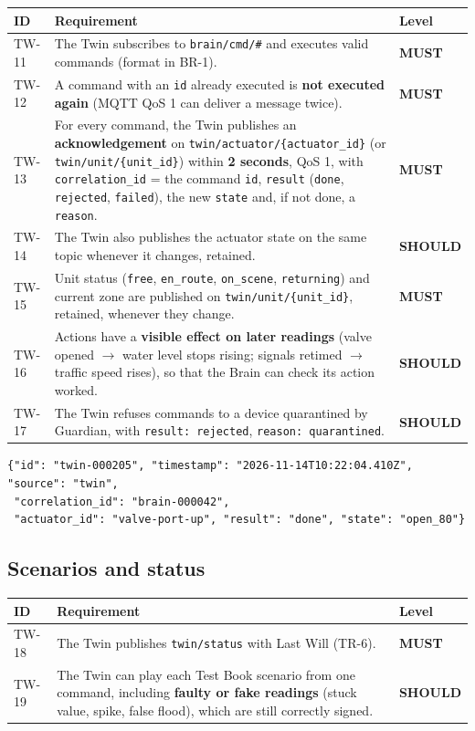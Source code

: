 \documentclass[11pt,a4paper]{article}
\newcommand{\code}[1]{\texttt{#1}}
\newcommand{\MUST}{\textbf{\textcolor{must}{MUST}}}
\newcommand{\SHOULD}{\textbf{\textcolor{should}{SHOULD}}}
\begin{document}
\begin{longtable}{@{}l p{10.9cm} l@{}}
\toprule
\textbf{ID} & \textbf{Requirement} & \textbf{Level} \\
\midrule
\endhead
TW-11 & The Twin subscribes to \code{brain/cmd/\#} and executes valid commands (format in BR-1). & \MUST \\
TW-12 & A command with an \code{id} already executed is \textbf{not executed again} (MQTT QoS 1 can deliver a message twice). & \MUST \\
TW-13 & For every command, the Twin publishes an \textbf{acknowledgement} on \code{twin/\allowbreak actuator/\allowbreak \{actuator\_id\}} (or \code{twin/\allowbreak unit/\allowbreak \{unit\_id\}}) within \textbf{2 seconds}, QoS 1, with \code{correlation\_id} = the command \code{id}, \code{result} (\code{done}, \code{rejected}, \code{failed}), the new \code{state} and, if not done, a \code{reason}. & \MUST \\
TW-14 & The Twin also publishes the actuator state on the same topic whenever it changes, retained. & \SHOULD \\
TW-15 & Unit status (\code{free}, \code{en\_route}, \code{on\_scene}, \code{returning}) and current zone are published on \code{twin/\allowbreak unit/\allowbreak \{unit\_id\}}, retained, whenever they change. & \MUST \\
TW-16 & Actions have a \textbf{visible effect on later readings} (valve opened $\rightarrow$ water level stops rising; signals retimed $\rightarrow$ traffic speed rises), so that the Brain can check its action worked. & \SHOULD \\
TW-17 & The Twin refuses commands to a device quarantined by Guardian, with \code{result: rejected}, \code{reason: quarantined}. & \SHOULD \\
\bottomrule
\end{longtable}

\begin{lstlisting}[caption={Body of an acknowledgement}]
{"id": "twin-000205", "timestamp": "2026-11-14T10:22:04.410Z", "source": "twin",
 "correlation_id": "brain-000042",
 "actuator_id": "valve-port-up", "result": "done", "state": "open_80"}
\end{lstlisting}

\subsection{Scenarios and status}

\begin{longtable}{@{}l p{10.9cm} l@{}}
\toprule
\textbf{ID} & \textbf{Requirement} & \textbf{Level} \\
\midrule
\endhead
TW-18 & The Twin publishes \code{twin/status} with Last Will (TR-6). & \MUST \\
TW-19 & The Twin can play each Test Book scenario from one command, including \textbf{faulty or fake readings} (stuck value, spike, false flood), which are still correctly signed. & \SHOULD \\
\bottomrule
\end{longtable}
\end{document}
